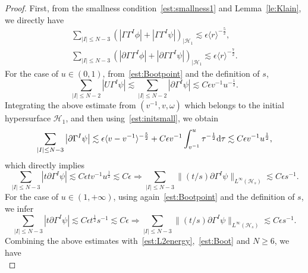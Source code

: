 \documentclass[a4paper,reqno]{amsart}
\theoremstyle{definition}
\numberwithin{equation}{section}
\def \d {{\rm{d}}}
\begin{document}
\begin{proof}
First, from the smallness condition~\eqref{est:smallness1} and Lemma~\ref{le:Klain}, we directly have 
\begin{equation}\label{est:initsmall}
\begin{aligned}
    \sum_{|I|\le N-3}\left(|\Gamma \Gamma^{I}\phi|+|\Gamma\Gamma^{I}\psi|\right)_{|\mathcal{H}_{1}}\lesssim \epsilon\langle r\rangle^{-\frac{5}{2}},\\
    \sum_{|I|\le N-3}
    \left(|\partial\Gamma \Gamma^{I}\phi|+|\partial\Gamma\Gamma^{I}\psi|\right)_{|\mathcal{H}_{1}}
    \lesssim \epsilon\langle r\rangle^{-\frac{7}{2}}.
    \end{aligned}
\end{equation}
For the case of $u\in (0,1)$, from~\eqref{est:Bootpoint} and the definition of $s$, 
\begin{equation*}
   \sum_{|I|\le N-2}
       \left|U\Gamma^{I}\psi\right|\lesssim  \sum_{|I|\le N-2}
       \left|\partial \Gamma^{I}\psi\right|\lesssim C\epsilon  v^{-1}u^{-\frac{1}{2}}.
\end{equation*}
Integrating the above estimate from $(v^{-1},v,\omega)$ which belongs to the initial hypersurface $\mathcal{H}_{1}$, and then using~\eqref{est:initsmall}, we obtain
\begin{equation}\label{est:localu}
    \sum_{|I|\le N-3}\left|\partial \Gamma^{I}\psi\right|\lesssim \epsilon\langle v-v^{-1}\rangle^{-\frac{5}{2}}+
    C\epsilon v^{-1}\int_{v^{-1}}^{u}\tau^{-\frac{1}{2}}\d \tau \lesssim 
    C\epsilon v^{-1}u^{\frac{1}{2}},
\end{equation}
which directly implies 
\begin{equation*}
    \sum_{|I|\le N-3}\left|t\partial \Gamma^{I}\psi\right|\lesssim C\epsilon tv^{-1}u^{\frac{1}{2}}\lesssim  C\epsilon \Longrightarrow 
    \sum_{|I|\le N-3}\|(t/s)\partial\Gamma^{I}\psi\|_{L^{\infty}(\mathcal{H}_{s})}\lesssim C\epsilon s^{-1}.
\end{equation*}
For the case of $u\in (1,+\infty)$, using again~\eqref{est:Bootpoint} and the definition of $s$, we infer
\begin{equation*}
    \sum_{|I|\le N-3}\left|t\partial \Gamma^{I}\psi\right|\lesssim C\epsilon t^{\frac{1}{2}}s^{-1}\lesssim  C\epsilon \Longrightarrow 
    \sum_{|I|\le N-3}\|(t/s)\partial\Gamma^{I}\psi\|_{L^{\infty}(\mathcal{H}_{s})}\lesssim C\epsilon s^{-1}.
\end{equation*}
Combining the above estimates with~\eqref{est:L2energy},~\eqref{est:Boot} and $N\ge 6$, we have 
\begin{equation*}

\end{equation*}
\end{proof}
\end{document}
